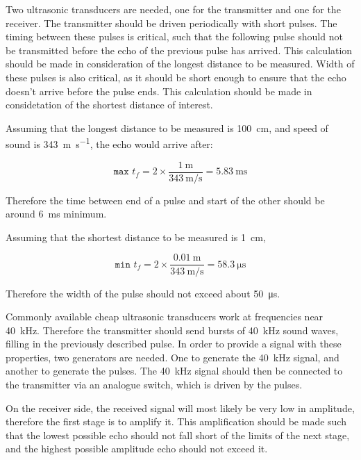 \documentclass[12pt, a4paper]{article}
\begin{document}
        \bigskip

        Two ultrasonic transducers are needed, one for the transmitter and one for the receiver. The transmitter should be driven periodically with short pulses. The timing between these pulses is critical, such that the following pulse should not be transmitted before the echo of the previous pulse has arrived. This calculation should be made in consideration of the longest distance to be measured. Width of these pulses is also critical, as it should be short enough to ensure that the echo doesn't arrive before the pulse ends. This calculation should be made in considetation of the shortest distance of interest. 

        Assuming that the longest distance to be measured is \SI{100}{\centi\metre}, and speed of sound is \SI{343}{\metre\per\second}, the echo would arrive after:

        \begin{equation}
            \texttt{max }t_f = 2 \times \frac{\SI{1}{\metre}}{\SI{343}{\metre\per\second}} = \SI{5.83}{\milli\second}
        \end{equation}

        \noindent Therefore the time between end of a pulse and start of the other should be around \SI{6}{\milli\second} minimum. 

        \noindent Assuming that the shortest distance to be measured is \SI{1}{\centi\metre}, 

        \begin{equation}
            \texttt{min }t_f = 2 \times \frac{\SI{0.01}{\metre}}{\SI{343}{\metre\per\second}} = \SI{58.3}{\micro\second}
        \end{equation}

        \noindent Therefore the width of the pulse should not exceed about \SI{50}{\micro\second}.


        \bigskip
        Commonly available cheap ultrasonic transducers work at frequencies near \SI{40}{\kilo\hertz}. Therefore the transmitter should send bursts of \SI{40}{\kilo\hertz} sound waves, filling in the previously described pulse. In order to provide a signal with these properties, two generators are needed. One to generate the \SI{40}{\kilo\hertz} signal, and another to generate the pulses. The \SI{40}{\kilo\hertz} signal should then be connected to the transmitter via an analogue switch, which is driven by the pulses.

        \bigskip
        On the receiver side, the received signal will most likely be very low in amplitude, therefore the first stage is to amplify it. This amplification should be made such that the lowest possible echo should not fall short of the limits of the next stage, and the highest possible amplitude echo should not exceed it.
        
\end{document}
